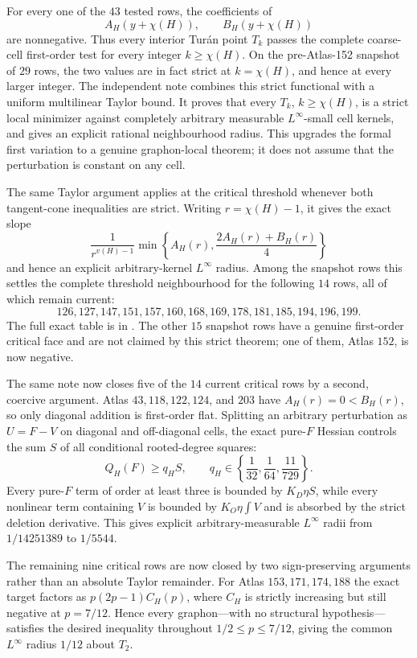 \documentclass[11pt]{article}
\begin{document}
For every one of the $43$ tested rows, the coefficients of
\[
 A_H(y+\chi(H)),\qquad B_H(y+\chi(H))
\]
are nonnegative.  Thus every interior Tur\'an point $T_k$ passes the complete
coarse-cell first-order test for every integer $k\geq\chi(H)$.  On the
pre-Atlas-152 snapshot of $29$ rows, the two values are in fact strict at
$k=\chi(H)$, and hence at every larger integer.  The independent note
 combines this strict
functional with a uniform multilinear Taylor bound.  It proves that every
$T_k$, $k\geq\chi(H)$, is a strict local minimizer against completely
arbitrary measurable $L^\infty$-small cell kernels, and gives an explicit
rational neighbourhood radius.  This upgrades the formal first variation
to a genuine graphon-local theorem; it does not assume that the perturbation
is constant on any cell.

The same Taylor argument applies at the critical threshold whenever both
tangent-cone inequalities are strict.  Writing $r=\chi(H)-1$, it gives the
exact slope
\[
 \frac1{r^{v(H)-1}}
 \min\left\{A_H(r),\frac{2A_H(r)+B_H(r)}4\right\}
\]
and hence an explicit arbitrary-kernel $L^\infty$ radius.  Among the snapshot
rows this settles the complete threshold neighbourhood for the following
$14$ rows, all of which remain current:
\[
126,127,147,151,157,160,168,169,178,181,185,194,196,199.
\]
The full exact table is in
.  The other $15$
snapshot rows have a genuine first-order critical face and are not claimed by
this strict theorem; one of them, Atlas $152$, is now negative.

The same note now closes five of the $14$ current critical rows by a second,
coercive argument.  Atlas $43,118,122,124$, and $203$ have
$A_H(r)=0<B_H(r)$, so only diagonal addition is first-order flat.  Splitting
an arbitrary perturbation as $U=F-V$ on diagonal and off-diagonal cells, the
exact pure-$F$ Hessian controls the sum $S$ of all conditional rooted-degree
squares:
\[
 Q_H(F)\geq q_HS,
 \qquad
 q_H\in\left\{\frac1{32},\frac1{64},\frac{11}{729}\right\}.
\]
Every pure-$F$ term of order at least three is bounded by $K_D\eta S$, while
every nonlinear term containing $V$ is bounded by
$K_O\eta\int V$ and is absorbed by the strict deletion derivative.  This
gives explicit arbitrary-measurable $L^\infty$ radii from $1/14251389$ to
$1/5544$.

The remaining nine critical rows are now closed by two sign-preserving
arguments rather than an absolute Taylor remainder.  For Atlas
$153,171,174,188$ the exact target factors as
$p(2p-1)C_H(p)$, where $C_H$ is strictly increasing but still negative at
$p=7/12$.  Hence every graphon---with no structural hypothesis---satisfies
the desired inequality throughout $1/2\leq p\leq7/12$, giving the common
$L^\infty$ radius $1/12$ about $T_2$.
\end{document}
